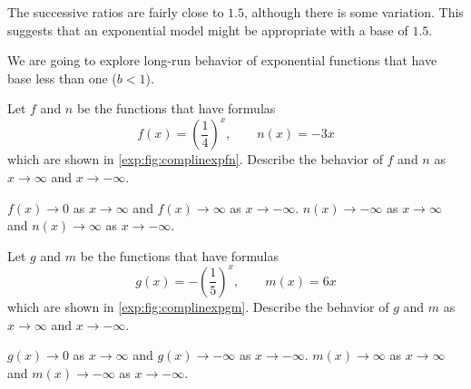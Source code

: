 \begin{exercises}
\begin{problem}
\begin{shortsolution}
	The successive ratios are fairly close to $1.5$, although there is some variation.  This suggests that an exponential model might be appropriate with a base of $1.5$.
											
\end{shortsolution}
\end{problem}
			
			
\begin{problem}
We are going to explore long-run behavior of exponential functions that have base less than one ($b<1$).
\begin{subproblem}
	Let $f$ and $n$ be the functions that have formulas
	\[
		f(x)=\left( \frac{1}{4} \right)^x, \qquad n(x)=-3x
	\]
	which are shown in \cref{exp:fig:complinexpfn}. Describe the behavior
	of $f$ and $n$ as $x\to\infty$ and $x\to-\infty$.
	\begin{shortsolution}
		$f(x)\to 0$ as $x\to\infty$ and $f(x)\to\infty$ as $x\to-\infty$.
		$n(x)\to-\infty$ as $x\to\infty$ and $n(x)\to\infty$ as $x\to-\infty$.
	\end{shortsolution}
\end{subproblem}
\begin{subproblem}
	Let $g$ and $m$ be the functions that have formulas
	\[
		g(x)= -\left( \frac{1}{5} \right)^x, \qquad m(x)=6x
	\]
	which are shown in \cref{exp:fig:complinexpgm}. Describe the behavior
	of $g$ and $m$ as $x\to\infty$ and $x\to-\infty$.
	\begin{shortsolution}
		$g(x)\to 0$ as $x\to\infty$ and $g(x)\to-\infty$ as $x\to-\infty$.
		$m(x)\to\infty$ as $x\to\infty$ and $m(x)\to-\infty$ as $x\to-\infty$.
	\end{shortsolution}
\end{subproblem}
\end{problem}
\begin{figure}[!htb]
	\begin{widepage}
	\centering
	\hfill
	\begin{minipage}{0.3\textwidth}
\end{minipage}
\end{widepage}
\end{figure}
\end{exercises}
